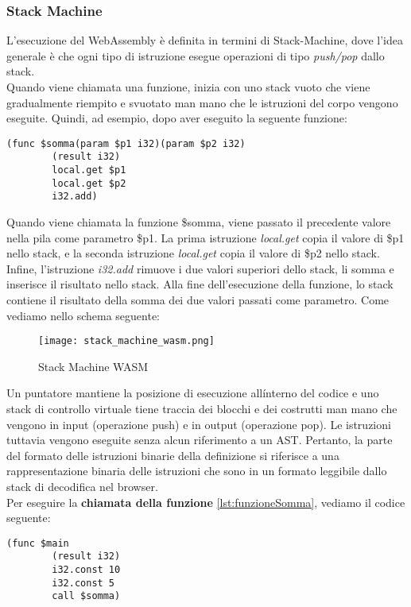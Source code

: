 \documentclass[../../main.tex]{subfiles}
\begin{document}
\subsubsection{Stack Machine}
L'esecuzione del WebAssembly è definita in termini di Stack-Machine, dove l'idea generale è che ogni tipo di istruzione esegue operazioni di tipo \textit{push/pop} dallo stack.\\
Quando viene chiamata una funzione, inizia con uno stack vuoto che viene gradualmente riempito e svuotato man mano che le istruzioni del corpo vengono eseguite. Quindi, ad esempio, dopo aver eseguito la seguente funzione:
\begin{lstlisting}[language=WebAssembly, label={lst:funzioneSomma}]
    (func $somma(param $p1 i32)(param $p2 i32)
        (result i32)
        local.get $p1
        local.get $p2
        i32.add)
\end{lstlisting}
Quando viene chiamata la funzione \$somma, viene passato il precedente valore nella pila come parametro \$p1. La prima istruzione \textit{local.get} copia il valore di \$p1 nello stack, e la seconda istruzione \textit{local.get} copia il valore di \$p2 nello stack. Infine, l'istruzione \textit{i32.add} rimuove i due valori superiori dello stack, li somma e inserisce il risultato nello stack. Alla fine dell'esecuzione della funzione, lo stack contiene il risultato della somma dei due valori passati come parametro.
Come vediamo nello schema seguente:
\begin{figure}[H]
    \centering
    \texttt{[image: stack\_machine\_wasm.png]}
    \caption{Stack Machine WASM}
    \label{fig:stack_machine}
\end{figure}
Un puntatore mantiene la posizione di esecuzione all\' interno del codice e uno stack di controllo virtuale tiene traccia dei blocchi e dei costrutti man mano che vengono in input (operazione push) e in output (operazione pop). Le istruzioni tuttavia vengono eseguite senza alcun riferimento a un AST. Pertanto, la parte del formato delle istruzioni binarie della definizione si riferisce a una rappresentazione binaria delle istruzioni che sono in un formato leggibile dallo stack di decodifica nel browser.\autocite{amslaurea20464}\\
Per eseguire la \textbf{chiamata della funzione} \ref{lst:funzioneSomma}, vediamo il codice seguente:
\begin{lstlisting}[language=WebAssembly]
    (func $main
        (result i32)
        i32.const 10
        i32.const 5
        call $somma)
\end{lstlisting}
\end{document}
